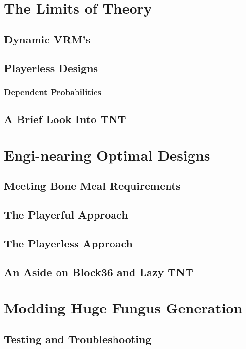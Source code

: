 \documentclass[11pt,a4paper]{article}
\begin{document}
\section{The Limits of Theory}
    \subsection{Dynamic VRM's}
    \lipsum[15]
    \subsection{Playerless Designs}
    \lipsum[16]
    \subsubsection{Dependent Probabilities}
    \lipsum[21]
    \subsection{A Brief Look Into TNT}
    \lipsum[16]

\section{Engi-nearing Optimal Designs}
    \subsection{Meeting Bone Meal Requirements}
    \lipsum[8]
    \subsection{The Playerful Approach}
    \lipsum[8]
    \subsection{The Playerless Approach}
    \lipsum[9]
    \subsection{An Aside on Block36 and Lazy TNT}
    \lipsum[8]

\section{Modding Huge Fungus Generation}
    \subsection{Testing and Troubleshooting}
    \lipsum[15]
\end{document}
